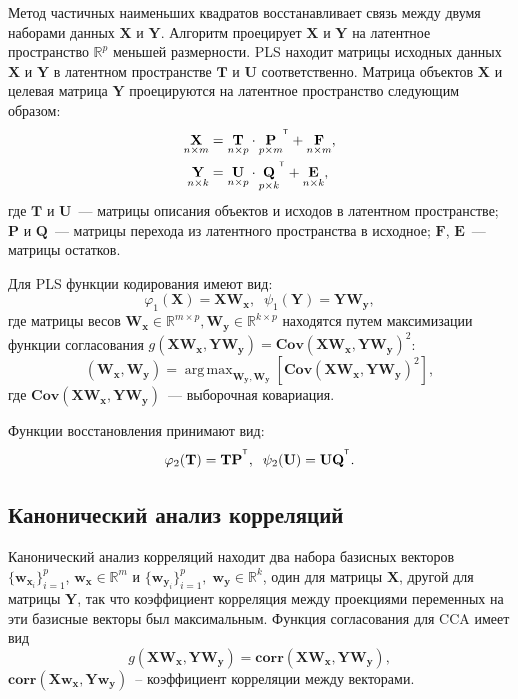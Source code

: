 \documentclass[12pt]{article}
\DeclareMathOperator*{\argmax}{arg\,max}
\newcommand{\bx}{\mathbf{x}}
\newcommand{\by}{\mathbf{y}}
\newcommand{\bw}{\mathbf{w}}
\newcommand{\bY}{\mathbf{Y}}
\newcommand{\bX}{\mathbf{X}}
\newcommand{\bP}{\mathbf{P}}
\newcommand{\bT}{\mathbf{T}}
\newcommand{\bQ}{\mathbf{Q}}
\newcommand{\bU}{\mathbf{U}}
\newcommand{\bW}{\mathbf{W}}
\newcommand{\T}{^{\text{\tiny\sffamily\upshape\mdseries T}}}
\begin{document}
	Метод частичных наименьших квадратов восстанавливает связь между двумя наборами данных $\bX$ и $\bY$. Алгоритм проецирует $\bX$ и $\bY$ на латентное пространство $\mathbb{R}^{p}$ меньшей размерности. PLS находит матрицы исходных данных $\bX$ и $\bY$ в латентном пространстве $\textbf{T}$ и $\textbf{U}$ соответственно. Матрица объектов $\bX$ и целевая матрица $\bY$ проецируются на латентное пространство следующим образом:
	\begin{align}
		\underset{n \times m}{\bX}  &= \underset{n \times p}{\textbf{T}} \cdot \underset{p \times m}{\textbf{P}}^{\T} +  \underset{n \times m}{\textbf{F}},
		\label{eq:PLSpr1} \\
		\underset{n \times k}{\bY}  &= \underset{n \times p}{\textbf{U}} \cdot \underset{p \times k}{\bQ}^{\T} + \underset{n \times k}{\textbf{E}},
		\label{eq:PLSpr2}
	\end{align}
	\noindent где $\textbf{T}$ и $\textbf{U}$~--- матрицы описания объектов и исходов в латентном пространстве; $\textbf{P}$ и $\textbf{Q}$~--- матрицы перехода из латентного пространства в исходное; $\textbf{F}$, $\textbf{E}$~--- матрицы остатков.
	
	Для PLS  функции кодирования имеют вид:
	\begin{equation}
		\varphi_1(\bX) = \bX \bW_{\bx}, \;\;
		\psi_1(\bY) = \bY \bW_{\by},
	\end{equation} 
	где матрицы весов $\bW_{\bx} \in \mathbb{R}^{m \times p}, \bW_{\by} \in \mathbb{R}^{k \times p}$ находятся путем максимизации функции согласования $g(\bX \bW_{\bx},  \bY \bW_{\by}) = \textbf{Cov} (\bX \bW_{\bx},  \bY \bW_{\by})^{2}$:
	\begin{equation}
		(\bW_{\bx}, \bW_{\by}) = \argmax_{\bW_{\by}, \bW_{\by}}[ \textbf{Cov}(\bX \bW_{\bx}, \bY \bW_{\by})^{2}],
		\label{eq:PLSpr3}
	\end{equation}
	где $\textbf{Cov}(\bX \bW_{\bx}, \bY \bW_{\by})$~--- выборочная ковариация.
	
	\noindent Функции восстановления принимают вид:
	\begin{equation}
		\varphi_2(\bT) = \bT\bP^{\T}, \;\;
		\psi_2(\bU) = \bU \bQ^{\T}.
	\end{equation} 
	
	\subsection{Канонический анализ корреляций}
	
	Канонический анализ корреляций находит два набора базисных векторов $\{\bw_{\bx_i}\}_{i=1}^{p}$, $\bw_{\bx} \in \mathbb{R}^{m}$ и $\{\bw_{\by_i}\}_{i=1}^{p}, \; \bw_{\by} \in \mathbb{R}^{k}$, один для матрицы $\bX$, другой для матрицы $\bY$, так что коэффициент корреляция между проекциями переменных на эти базисные векторы был максимальным. Функция согласования для CCA имеет вид
	\begin{equation}
		g(\bX \bW_{\bx}, \bY \bW_{\by}) = \textbf{corr}(\bX \bW_{\bx}, \bY \bW_{\by}),
	\end{equation} 
	 $\textbf{corr}(\bX \bw_{\bx}, \bY \bw_{\by})$~-- коэффициент корреляции между векторами.
	
\end{document}
